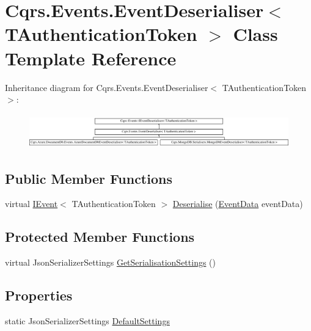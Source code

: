 \hypertarget{classCqrs_1_1Events_1_1EventDeserialiser}{}\section{Cqrs.\+Events.\+Event\+Deserialiser$<$ T\+Authentication\+Token $>$ Class Template Reference}
\label{classCqrs_1_1Events_1_1EventDeserialiser}
Inheritance diagram for Cqrs.\+Events.\+Event\+Deserialiser$<$ T\+Authentication\+Token $>$\+:\begin{figure}[H]
\begin{center}
\leavevmode
\includegraphics[height=1.508079cm]{classCqrs_1_1Events_1_1EventDeserialiser}
\end{center}
\end{figure}
\subsection*{Public Member Functions}
\begin{DoxyCompactItemize}
\item 
virtual \hyperlink{interfaceCqrs_1_1Events_1_1IEvent}{I\+Event}$<$ T\+Authentication\+Token $>$ \hyperlink{classCqrs_1_1Events_1_1EventDeserialiser_a193feac1d58446f0a7447d8ba04179fc}{Deserialise} (\hyperlink{classCqrs_1_1Events_1_1EventData}{Event\+Data} event\+Data)
\end{DoxyCompactItemize}
\subsection*{Protected Member Functions}
\begin{DoxyCompactItemize}
\item 
virtual Json\+Serializer\+Settings \hyperlink{classCqrs_1_1Events_1_1EventDeserialiser_a3f767a1b793ea47bcafd9c64be47619e}{Get\+Serialisation\+Settings} ()
\end{DoxyCompactItemize}
\subsection*{Properties}
\begin{DoxyCompactItemize}
\item 
static Json\+Serializer\+Settings \hyperlink{classCqrs_1_1Events_1_1EventDeserialiser_a08bd067ca7ce8c28c7a83d444b7e468b}{Default\+Settings}
\end{DoxyCompactItemize}


